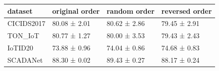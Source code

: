 \begin{tabular}{llll}
\toprule
dataset & original order & random order & reversed order \\
\midrule
CICIDS2017 & 80.08 ± 2.01 & 80.62 ± 2.86 & 79.45 ± 2.91 \\
TON\_IoT & 80.77 ± 1.27 & 80.00 ± 3.53 & 79.43 ± 2.43 \\
IoTID20 & 73.88 ± 0.96 & 74.04 ± 0.86 & 74.68 ± 0.83 \\
SCADANet & 88.30 ± 0.02 & 89.43 ± 0.27 & 88.17 ± 0.24 \\
\bottomrule
\end{tabular}
